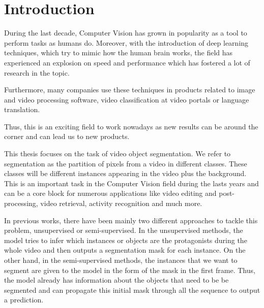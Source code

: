 
\chapter{Introduction}
\label{cha:introduction}

During the last decade, Computer Vision has grown in popularity as a tool to perform tasks as humans do.
Moreover, with the introduction of deep learning techniques, which try to mimic how the human brain works, the field has experienced an explosion on speed and performance which has fostered a lot of research in the topic.

Furthermore, many companies use these techniques in products related to image and video processing software, video classification at video portals or language translation.

Thus, this is an exciting field to work nowadays as new results can be around the corner and can lead us to new products.


This thesis focuses on the task of video object segmentation.
We refer to segmentation as the partition of pixels from a video in different classes.
These classes will be different instances appearing in the video plus the background.
This is an important task in the Computer Vision field during the lasts years and can be a core block for numerous applications like video editing and post-processing, video retrieval, activity recognition and much more.

In previous works, there have been mainly two different approaches to tackle this problem, unsupervised or semi-supervised.
In the unsupervised methods, the model tries to infer which instances or objects are the protagonists during the whole video and then outputs a segmentation mask for each instance.
On the other hand, in the semi-supervised methods, the instances that we want to segment are given to the model in the form of the mask in the first frame.
Thus, the model already has information about the objects that need to be be segmented and can propagate this initial mask through all the sequence to output a prediction.

